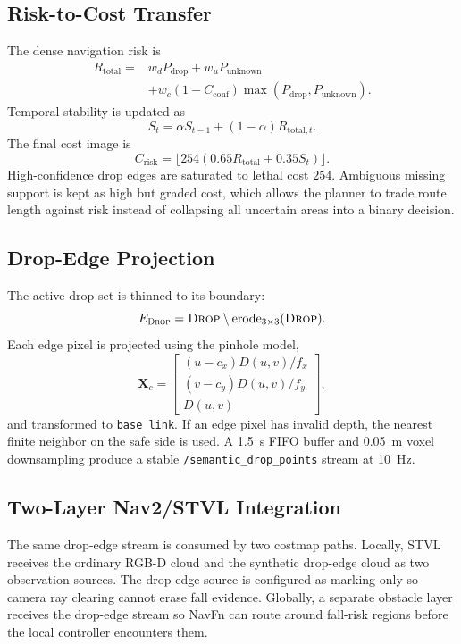 \documentclass[journal]{IEEEtran}
\newcommand{\drop}{\textsc{Drop}}
\begin{document}
\subsection{Risk-to-Cost Transfer}
The dense navigation risk is
\begin{equation}
\begin{aligned}
R_\mathrm{total}={}&w_dP_\mathrm{drop}+w_uP_\mathrm{unknown}\\
&+w_c(1-C_\mathrm{conf})
\max(P_\mathrm{drop},P_\mathrm{unknown}).
\end{aligned}
\label{eq:risk_total}
\end{equation}
Temporal stability is updated as
\begin{equation}
S_t=\alpha S_{t-1}+(1-\alpha)R_{\mathrm{total},t}.
\label{eq:temporal}
\end{equation}
The final cost image is
\begin{equation}
C_\mathrm{risk}=\lfloor254(0.65R_\mathrm{total}+0.35S_t)\rfloor.
\label{eq:risk_cost}
\end{equation}
High-confidence drop edges are saturated to lethal cost $254$. Ambiguous missing support is
kept as high but graded cost, which allows the planner to trade route length against risk
instead of collapsing all uncertain areas into a binary decision.

\subsection{Drop-Edge Projection}
The active drop set is thinned to its boundary:
\begin{equation}
E_\drop=\drop\setminus \mathrm{erode}_{3\times3}(\drop).
\end{equation}
Each edge pixel is projected using the pinhole model,
\begin{equation}
\mathbf{X}_c=
\begin{bmatrix}
(u-c_x)D(u,v)/f_x\\
(v-c_y)D(u,v)/f_y\\
D(u,v)
\end{bmatrix},
\label{eq:proj}
\end{equation}
and transformed to \texttt{base\_link}. If an edge pixel has invalid depth, the nearest
finite neighbor on the safe side is used. A 1.5~s FIFO buffer and 0.05~m voxel
downsampling produce a stable \texttt{/semantic\_drop\_points} stream at 10~Hz.

\subsection{Two-Layer Nav2/STVL Integration}
\label{sec:twolayer}
The same drop-edge stream is consumed by two costmap paths. Locally, STVL receives the
ordinary RGB-D cloud and the synthetic drop-edge cloud as two observation sources. The
drop-edge source is configured as marking-only so camera ray clearing cannot erase fall
evidence. Globally, a separate obstacle layer receives the drop-edge stream so NavFn can
route around fall-risk regions before the local controller encounters them.
\end{document}
